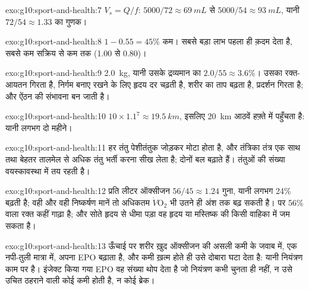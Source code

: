 \begin{solution}{exo:g10:sport-and-health:7}
$V_s = Q/f$: $5000/72 \approx \qty{69}{mL}$ से $5000/54 \approx
\qty{93}{mL}$, यानी $72/54 \approx 1.33$ का गुणक।
\end{solution}

\begin{solution}{exo:g10:sport-and-health:8}
$1 - 0.55 = 45\%$ कम। सबसे बड़ा लाभ पहला ही क़दम देता है, सबसे कम सक्रिय
से कम तक (1.00 से 0.80)।
\end{solution}

\begin{solution}{exo:g10:sport-and-health:9}
\qty{2.0}{kg}, यानी उसके द्रव्यमान का $2.0/55 \approx 3.6\%$। उसका
रक्त-आयतन गिरता है, निर्गम बनाए रखने के लिए हृदय दर चढ़ती है, शरीर का ताप
बढ़ता है, प्रदर्शन गिरता है; और ऐंठन की संभावना बन जाती है।
\end{solution}

\begin{solution}{exo:g10:sport-and-health:10}
$10 \times 1.1^7 \approx \qty{19.5}{km}$, इसलिए \qty{20}{km} आठवें
हफ़्ते में पहुँचता है: यानी लगभग दो महीने।
\end{solution}

\begin{solution}{exo:g10:sport-and-health:11}
हर तंतु पेशीतंतुक जोड़कर मोटा होता है, और तंत्रिका तंत्र एक साथ तथा बेहतर
तालमेल से अधिक तंतु भर्ती करना सीख लेता है; दोनों बल बढ़ाते हैं। तंतुओं की
संख्या वयस्कावस्था में तय रहती है।
\end{solution}

\begin{solution}{exo:g10:sport-and-health:12}
प्रति लीटर ऑक्सीजन $56/45 \approx 1.24$ गुना, यानी लगभग 24\% बढ़ती है;
वही  और वही निष्कर्षण मानें तो अधिकतम $\dot V\!\mathrm{O_2}$
भी उतने ही अंश तक बढ़ सकती है। पर 56\%  वाला रक्त कहीं गाढ़ा है;
और सोते हृदय से धीमा पड़ा वह हृदय या मस्तिष्क की किसी वाहिका में जम सकता
है।
\end{solution}

\begin{solution}{exo:g10:sport-and-health:13}
ऊँचाई पर शरीर ख़ुद ऑक्सीजन की असली कमी के जवाब में, एक नपी-तुली मात्रा
में, अपना EPO बढ़ाता है, और कमी ख़त्म होते ही उसे दोबारा घटा देता है:
यानी नियंत्रण काम पर है। इंजेक्ट किया गया EPO वह संख्या थोप देता है जो
नियंत्रण कभी चुनता ही नहीं, न उसे उचित ठहराने वाली कोई कमी होती है, न कोई
ब्रेक।
\end{solution}


